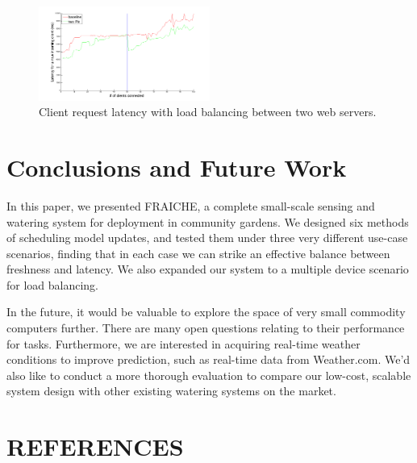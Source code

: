 \documentclass[a4paper]{acm_proc_article-sp}
\begin{document}
\begin{figure}
  \centering
      \includegraphics[width=0.5\textwidth]{two_pis.png}
  \caption{\label{fig:parallel_result}Client request latency with load balancing between two web servers.}
\end{figure}

\section{Conclusions and Future Work}

In this paper, we presented FRAICHE, a complete small-scale sensing and watering system for deployment in community gardens.  We designed six methods of scheduling model updates, and tested them under three very different use-case scenarios, finding that in each case we can strike an effective balance between freshness and latency. We also expanded our system to a multiple device scenario for load balancing.

In the future, it would be valuable to explore the space of very small commodity computers further.  There are many open questions relating to their performance for tasks. Furthermore, we are interested in acquiring real-time weather conditions to improve prediction, such as real-time data from Weather.com. We'd also like to conduct a more thorough evaluation to compare our low-cost, scalable system design with other existing watering systems on the market.


\section{REFERENCES}




\end{document}
